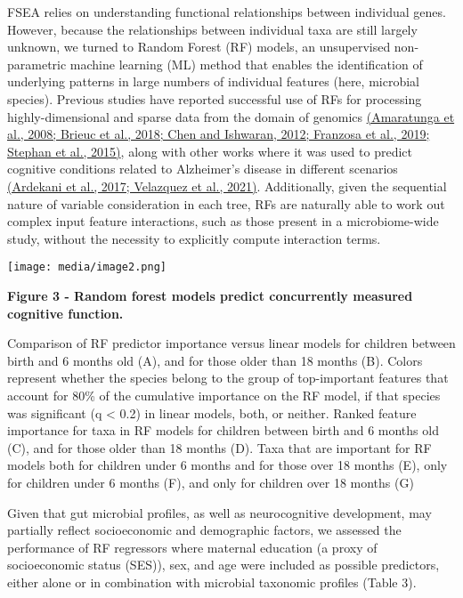 \documentclass[
]{article}
\begin{document}
FSEA relies on understanding functional relationships between individual
genes. However, because the relationships between individual taxa are
still largely unknown, we turned to Random Forest (RF) models, an
unsupervised non-parametric machine learning (ML) method that enables
the identification of underlying patterns in large numbers of individual
features (here, microbial species). Previous studies have reported
successful use of RFs for processing highly-dimensional and sparse data
from the domain of genomics
\href{https://www.zotero.org/google-docs/?C3CSPB}{(Amaratunga et al.,
2008; Brieuc et al., 2018; Chen and Ishwaran, 2012; Franzosa et al.,
2019; Stephan et al., 2015)}, along with other works where it was used
to predict cognitive conditions related to Alzheimer's disease in
different scenarios
\href{https://www.zotero.org/google-docs/?GiadGy}{(Ardekani et al.,
2017; Velazquez et al., 2021)}. Additionally, given the sequential
nature of variable consideration in each tree, RFs are naturally able to
work out complex input feature interactions, such as those present in a
microbiome-wide study, without the necessity to explicitly compute
interaction terms.

\texttt{[image: media/image2.png]}

\textbf{Figure 3 - Random forest models predict concurrently measured
cognitive function.}

Comparison of RF predictor importance versus linear models for children
between birth and 6 months old (A), and for those older than 18 months
(B). Colors represent whether the species belong to the group of
top-important features that account for 80\% of the cumulative
importance on the RF model, if that species was significant (q
\textless{} 0.2) in linear models, both, or neither. Ranked feature
importance for taxa in RF models for children between birth and 6 months
old (C), and for those older than 18 months (D). Taxa that are important
for RF models both for children under 6 months and for those over 18
months (E), only for children under 6 months (F), and only for children
over 18 months (G)

Given that gut microbial profiles, as well as neurocognitive
development, may partially reflect socioeconomic and demographic
factors, we assessed the performance of RF regressors where maternal
education (a proxy of socioeconomic status (SES)), sex, and age were
included as possible predictors, either alone or in combination with
microbial taxonomic profiles (Table 3).
\end{document}
